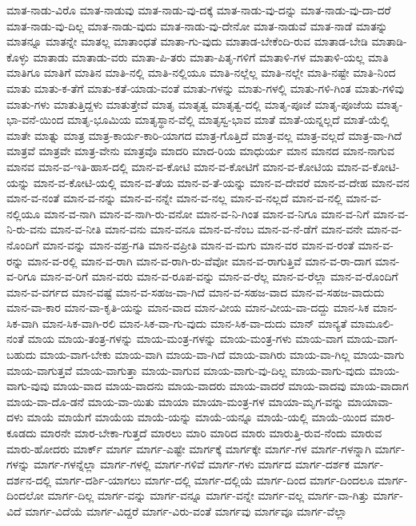 {ಮಾತ-ನಾಡು-ವಿರೊ
ಮಾತ-ನಾಡುವು
ಮಾತ-ನಾಡು-ವು-ದಕ್ಕೆ
ಮಾತ-ನಾಡು-ವು-ದನ್ನು
ಮಾತ-ನಾಡು-ವು-ದಾ-ದರೆ
ಮಾತ-ನಾಡು-ವು-ದಿಲ್ಲ
ಮಾತ-ನಾಡು-ವುದು
ಮಾತ-ನಾಡು-ವು-ದೇನೋ
ಮಾತ-ನಾಡುವೆ
ಮಾತ-ನಾಡೆ
ಮಾತನ್ನು
ಮಾತನ್ನೂ
ಮಾತನ್ನೇ
ಮಾತಲ್ಲ
ಮಾತಾಂಧತೆ
ಮಾತಾ-ಗು-ವುದು
ಮಾತಾಡ-ಬೇಕೆಂದಿ-ರುವ
ಮಾತಾಡ-ಬೇಡಿ
ಮಾತಾಡಿ-ಕೊಳ್ಳು
ಮಾತಾಡು
ಮಾತಾಡು-ವರು
ಮಾತಾ-ಪಿ-ತರು
ಮಾತಾ-ಪಿತೃ-ಗಳಿಗೆ
ಮಾತಾಳಿ-ಗಳ
ಮಾತಾಳಿ-ಯಲ್ಲ
ಮಾತಿ
ಮಾತಿಗೂ
ಮಾತಿಗೆ
ಮಾತಿನ
ಮಾತಿ-ನಲ್ಲಿ
ಮಾತಿ-ನಲ್ಲಿಯೂ
ಮಾತಿ-ನಲ್ಲೆಲ್ಲ
ಮಾತಿ-ನಲ್ಲೇ
ಮಾತಿ-ನಷ್ಟೇ
ಮಾತಿ-ನಿಂದ
ಮಾತು
ಮಾತು-ಕ-ತೆಗೆ
ಮಾತು-ಕತೆ-ಯಾಡು-ವಂತೆ
ಮಾತು-ಗಳನ್ನು
ಮಾತು-ಗಳಲ್ಲಿ
ಮಾತು-ಗಳಿ-ಗಿಂತ
ಮಾತು-ಗಳಿವು
ಮಾತು-ಗಳು
ಮಾತುತ್ತಿದ್ದಳು
ಮಾತುತ್ತೇವೆ
ಮಾತೃ
ಮಾತೃತ್ವ
ಮಾತೃತ್ವ-ದಲ್ಲಿ
ಮಾತೃ-ಪೂಜೆ
ಮಾತೃ-ಪೂಜೆಯ
ಮಾತೃ-ಭಾ-ವನೆ-ಯಿಂದ
ಮಾತೃ-ಭೂಮಿಯ
ಮಾತೃಸ್ಥಾನ-ವೆಲ್ಲಿ
ಮಾತೃಸ್ವ-ಭಾವ
ಮಾತೆ
ಮಾತೆ-ಯನ್ನಲ್ಲದೆ
ಮಾತೆ-ಯೆಲ್ಲಿ
ಮಾತೇ
ಮಾತ್ನು
ಮಾತ್ರ
ಮಾತ್ರ-ಕಾರ್ಯ-ಕಾರಿ-ಯಾಗದ
ಮಾತ್ರ-ಗೊತ್ತಿದೆ
ಮಾತ್ರ-ವಲ್ಲ
ಮಾತ್ರ-ವಲ್ಲದೆ
ಮಾತ್ರ-ವಾ-ಗಿದೆ
ಮಾತ್ರವೆ
ಮಾತ್ರವೇ
ಮಾತ್ರ-ವೇನು
ಮಾತ್ರವೊ
ಮಾದರಿ
ಮಾದ-ರಿಯ
ಮಾಧುರ್ಯ
ಮಾನ
ಮಾನದ
ಮಾನ-ನಾಗುವ
ಮಾನವ
ಮಾನ-ವ-ಇತಿ-ಹಾಸ-ದಲ್ಲಿ
ಮಾನ-ವ-ಕೋಟಿ
ಮಾನ-ವ-ಕೋಟಿಗೆ
ಮಾನ-ವ-ಕೋಟಿಯ
ಮಾನ-ವ-ಕೋಟಿ-ಯನ್ನು
ಮಾನ-ವ-ಕೋಟಿ-ಯಲ್ಲಿ
ಮಾನ-ವ-ತೆಯ
ಮಾನ-ವ-ತೆ-ಯನ್ನು
ಮಾನ-ವ-ದೇವರೆ
ಮಾನ-ವ-ದೇಹ
ಮಾನ-ವನ
ಮಾನ-ವ-ನಂತೆ
ಮಾನ-ವ-ನನ್ನು
ಮಾನ-ವ-ನನ್ನೇ
ಮಾನ-ವ-ನಲ್ಲ
ಮಾನ-ವ-ನಲ್ಲದೆ
ಮಾನ-ವ-ನಲ್ಲಿ
ಮಾನ-ವ-ನಲ್ಲಿಯೂ
ಮಾನ-ವ-ನಾಗಿ
ಮಾನ-ವ-ನಾಗಿ-ರು-ವನೋ
ಮಾನ-ವ-ನಿ-ಗಿಂತ
ಮಾನ-ವ-ನಿಗೂ
ಮಾನ-ವ-ನಿಗೆ
ಮಾನ-ವ-ನಿ-ರು-ವನು
ಮಾನ-ವ-ನೀತಿ
ಮಾನ-ವನು
ಮಾನ-ವನೂ
ಮಾನ-ವ-ನೆಂಬ
ಮಾನ-ವ-ನೆ-ಡೆಗೆ
ಮಾನ-ವನೇ
ಮಾನ-ವ-ನೊಂದಿಗೆ
ಮಾನ-ವನ್ನು
ಮಾನ-ವಪ್ರ-ಗತಿ
ಮಾನ-ವಪ್ರೀತಿ
ಮಾನ-ವ-ಮಗು
ಮಾನ-ವರ
ಮಾನ-ವ-ರಂತೆ
ಮಾನ-ವ-ರನ್ನು
ಮಾನ-ವ-ರಲ್ಲಿ
ಮಾನ-ವ-ರಾಗಿ
ಮಾನ-ವ-ರಾಗಿ-ರು-ವೆವೋ
ಮಾನ-ವ-ರಾಗುತ್ತಿವೆ
ಮಾನ-ವ-ರಾ-ದಾಗ
ಮಾನ-ವ-ರಿಗೂ
ಮಾನ-ವ-ರಿಗೆ
ಮಾನ-ವರು
ಮಾನ-ವ-ರೂಪ-ವನ್ನು
ಮಾನ-ವ-ರೆಲ್ಲ
ಮಾನ-ವ-ರೆಲ್ಲಾ
ಮಾನ-ವ-ರೊಂದಿಗೆ
ಮಾನ-ವ-ವರ್ಗದ
ಮಾನ-ವಷ್ಟೆ
ಮಾನ-ವ-ಸಹಜ-ವಾ-ಗಿದೆ
ಮಾನ-ವ-ಸಹಜ-ವಾದ
ಮಾನ-ವ-ಸಹಜ-ವಾದುದು
ಮಾನ-ವಾ-ಕಾರ
ಮಾನ-ವಾ-ಕೃತಿ-ಯನ್ನು
ಮಾನ-ವಾದ
ಮಾನ-ವೀಯ
ಮಾನ-ವೀಯ-ವಾ-ದದ್ದು
ಮಾನ-ಸಿಕ
ಮಾನ-ಸಿಕ-ವಾಗಿ
ಮಾನ-ಸಿಕ-ವಾಗಿ-ರಲಿ
ಮಾನ-ಸಿಕ-ವಾ-ಗು-ವುದು
ಮಾನ-ಸಿಕ-ವಾ-ದುದು
ಮಾನ್
ಮಾನ್ಯತೆ
ಮಾಮೂಲಿ-ನಂತೆ
ಮಾಯ
ಮಾಯ-ತಂತ್ರ-ಗಳನ್ನು
ಮಾಯ-ಮಂತ್ರ-ಗಳನ್ನು
ಮಾಯ-ಮಂತ್ರ-ಗಳು
ಮಾಯ-ವಾಗ
ಮಾಯ-ವಾಗ-ಬಹುದು
ಮಾಯ-ವಾಗ-ಬೇಕು
ಮಾಯ-ವಾಗಿ
ಮಾಯ-ವಾ-ಗಿದೆ
ಮಾಯ-ವಾಗಿರು
ಮಾಯ-ವಾ-ಗಿಲ್ಲ
ಮಾಯ-ವಾಗು
ಮಾಯ-ವಾಗುತ್ತವೆ
ಮಾಯ-ವಾಗುತ್ತಾ
ಮಾಯ-ವಾಗುವ
ಮಾಯ-ವಾಗು-ವು-ದಿಲ್ಲ
ಮಾಯ-ವಾಗು-ವುದು
ಮಾಯ-ವಾಗು-ವುವು
ಮಾಯ-ವಾದ
ಮಾಯ-ವಾದನು
ಮಾಯ-ವಾದರು
ಮಾಯ-ವಾದರೆ
ಮಾಯ-ವಾದವು
ಮಾಯ-ವಾದಾಗ
ಮಾಯ-ವಾ-ದೊ-ಡನೆ
ಮಾಯ-ವಾ-ಯಿತು
ಮಾಯಾ
ಮಾಯಾ-ಮಂತ್ರ-ಗಳ
ಮಾಯಾ-ಮೃಗ-ವನ್ನು
ಮಾಯಾವಾ-ದಳು
ಮಾಯೆ
ಮಾಯೆಗೆ
ಮಾಯೆಯ
ಮಾಯೆ-ಯನ್ನು
ಮಾಯೆ-ಯನ್ನೂ
ಮಾಯೆ-ಯಲ್ಲಿ
ಮಾಯೆ-ಯಿಂದ
ಮಾರ-ಕೂಡದು
ಮಾರನೇ
ಮಾರ-ಬೇಕಾ-ಗುತ್ತದೆ
ಮಾರಲು
ಮಾರಿ
ಮಾರಿದ
ಮಾರು
ಮಾರುತ್ತಿ-ರುವ-ನೆಂದು
ಮಾರುವ
ಮಾರು-ಹೋದರು
ಮಾರ್ಕ್
ಮಾರ್ಗ
ಮಾರ್ಗ-ಎಷ್ಟೇ
ಮಾರ್ಗಕ್ಕೆ
ಮಾರ್ಗಕ್ಕೇ
ಮಾರ್ಗ-ಗಳ
ಮಾರ್ಗ-ಗಳನ್ನಾಗಿ
ಮಾರ್ಗ-ಗಳನ್ನು
ಮಾರ್ಗ-ಗಳನ್ನೆಲ್ಲಾ
ಮಾರ್ಗ-ಗಳಲ್ಲಿ
ಮಾರ್ಗ-ಗಳಿವೆ
ಮಾರ್ಗ-ಗಳು
ಮಾರ್ಗದ
ಮಾರ್ಗ-ದರ್ಶಕ
ಮಾರ್ಗ-ದರ್ಶನ-ದಲ್ಲಿ
ಮಾರ್ಗ-ದರ್ಶಿ-ಯಾಗಲು
ಮಾರ್ಗ-ದಲ್ಲಿ
ಮಾರ್ಗ-ದಲ್ಲಿಯೆ
ಮಾರ್ಗ-ದಿಂದ
ಮಾರ್ಗ-ದಿಂದಲೂ
ಮಾರ್ಗ-ದಿಂದಲೋ
ಮಾರ್ಗ-ದಿಲ್ಲ
ಮಾರ್ಗ-ವನ್ನು
ಮಾರ್ಗ-ವನ್ನೂ
ಮಾರ್ಗ-ವನ್ನೇ
ಮಾರ್ಗ-ವಲ್ಲ
ಮಾರ್ಗ-ವಾ-ಗಿತ್ತು
ಮಾರ್ಗ-ವಿದೆ
ಮಾರ್ಗ-ವಿದೆಯೆ
ಮಾರ್ಗ-ವಿದ್ದರೆ
ಮಾರ್ಗ-ವಿರು-ವಂತೆ
ಮಾರ್ಗವು
ಮಾರ್ಗವೂ
ಮಾರ್ಗ-ವೆಲ್ಲಾ
}
